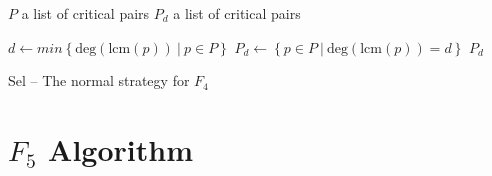 \begin{algorithm}[ht]
  \begin{algorithmic}[1]
    \Require
      \Statex $P$ a list of critical pairs
    \Ensure
      \Statex $P_d$ a list of critical pairs
      \Statex

    \State $d \gets min\left\{\textrm{deg}(\textrm{lcm}(p))\ |\ p\in P\right\}$
    \State $P_d \gets \left\{p\in P\ |\ \textrm{deg}(\textrm{lcm}(p)) = d\right\}$
    \State \Return $P_d$
  \end{algorithmic}
  \caption{Sel -- The normal strategy for $F_4$}
\end{algorithm}

\section{$F_5$ Algorithm}

